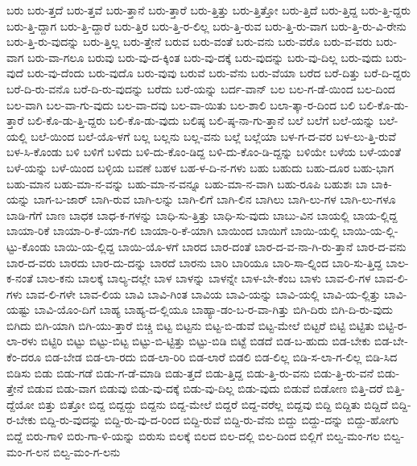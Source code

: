 {ಬರು
ಬರು-ತ್ತದೆ
ಬರು-ತ್ತವೆ
ಬರು-ತ್ತಾನೆ
ಬರು-ತ್ತಾರೆ
ಬರು-ತ್ತಿತ್ತು
ಬರು-ತ್ತಿತ್ತೋ
ಬರು-ತ್ತಿದೆ
ಬರು-ತ್ತಿದ್ದ
ಬರು-ತ್ತಿ-ದ್ದರು
ಬರು-ತ್ತಿ-ದ್ದಾಗ
ಬರು-ತ್ತಿ-ದ್ದಾರೆ
ಬರು-ತ್ತಿರ
ಬರು-ತ್ತಿ-ರ-ಲಿಲ್ಲ
ಬರು-ತ್ತಿ-ರುವ
ಬರು-ತ್ತಿ-ರು-ವಾಗ
ಬರು-ತ್ತಿ-ರು-ವಿ-ರೇನು
ಬರು-ತ್ತಿ-ರು-ವುದನ್ನು
ಬರು-ತ್ತಿಲ್ಲ
ಬರು-ತ್ತೇನೆ
ಬರುವ
ಬರು-ವಂತೆ
ಬರು-ವನು
ಬರು-ವರೊ
ಬರು-ವ-ವರು
ಬರು-ವಾಗ
ಬರು-ವಾ-ಗಲೂ
ಬರುವು
ಬರು-ವು-ದ-ಕ್ಕಿಂತ
ಬರು-ವು-ದಕ್ಕೆ
ಬರು-ವುದನ್ನು
ಬರು-ವು-ದಿಲ್ಲ
ಬರು-ವುದು
ಬರು-ವುದೆ
ಬರು-ವು-ದೆಂದು
ಬರು-ವುದೊ
ಬರು-ವುವು
ಬರುವೆ
ಬರು-ವೆನು
ಬರು-ವೆಯಾ
ಬರೆದ
ಬರೆ-ದಿತ್ತು
ಬರೆ-ದಿ-ದ್ದರು
ಬರೆ-ದಿ-ರು-ವನೊ
ಬರೆ-ದಿ-ರು-ವುದನ್ನು
ಬರೆದು
ಬರೆ-ಯನ್ನು
ಬರ್ದ-ವಾನ್
ಬಲ
ಬಲ-ಗ-ಡೆ-ಯಿಂದ
ಬಲ-ದಿಂದ
ಬಲ-ವಾಗಿ
ಬಲ-ವಾ-ಗು-ವುದು
ಬಲ-ವಾ-ದವು
ಬಲ-ವಾ-ಯಿತು
ಬಲ-ಶಾಲಿ
ಬಲಾ-ತ್ಕಾ-ರ-ದಿಂದ
ಬಲಿ
ಬಲಿ-ಕೊ-ಡು-ತ್ತಾರೆ
ಬಲಿ-ಕೊ-ಡು-ತ್ತಿ-ದ್ದರು
ಬಲಿ-ಕೊ-ಡು-ವುದು
ಬಲಿಷ್ಠ
ಬಲಿ-ಷ್ಠ-ನಾ-ಗು-ತ್ತಾನೆ
ಬಲೆ
ಬಲೆಗೆ
ಬಲೆ-ಯನ್ನು
ಬಲೆ-ಯಲ್ಲಿ
ಬಲೆ-ಯಿಂದ
ಬಲೆ-ಯೊ-ಳಗೆ
ಬಲ್ಲ
ಬಲ್ಲನು
ಬಲ್ಲ-ವನು
ಬಲ್ಲೆ
ಬಲ್ಲೆಯಾ
ಬಳ-ಗ-ದ-ವರ
ಬಳ-ಲು-ತ್ತಿ-ರುವೆ
ಬಳ-ಸಿ-ಕೊಂಡು
ಬಳಿ
ಬಳಿಗೆ
ಬಳಿದು
ಬಳಿ-ದು-ಕೊಂ-ಡಿದ್ದ
ಬಳಿ-ದು-ಕೊಂ-ಡಿ-ದ್ದನ್ನು
ಬಳಿಯೇ
ಬಳೆಯ
ಬಳೆ-ಯಂತೆ
ಬಳೆ-ಯನ್ನು
ಬಳೆ-ಯಿಂದ
ಬಳ್ಳಿಯ
ಬವಣೆ
ಬಹಳ
ಬಹ-ಳ-ದಿ-ನ-ಗಳು
ಬಹು
ಬಹುದು
ಬಹು-ದೂರ
ಬಹು-ಭಾಗ
ಬಹು-ಮಾನ
ಬಹು-ಮಾ-ನ-ವನ್ನು
ಬಹು-ಮಾ-ನ-ವನ್ನೂ
ಬಹು-ಮಾ-ನ-ವಾಗಿ
ಬಹು-ರೂಪಿ
ಬಹುಶಃ
ಬಾ
ಬಾಕಿ-ಯನ್ನು
ಬಾಗ-ಬ-ಜಾರ್
ಬಾಗಿ-ರುವ
ಬಾಗಿ-ಲನ್ನು
ಬಾಗಿ-ಲಿಗೆ
ಬಾಗಿ-ಲಿನ
ಬಾಗಿಲು
ಬಾಗಿ-ಲು-ಗಳ
ಬಾಗಿ-ಲು-ಗಳೂ
ಬಾಡಿ-ಗೆಗೆ
ಬಾಣ
ಬಾಧಕ
ಬಾಧ-ಕ-ಗಳನ್ನು
ಬಾಧಿ-ಸು-ತ್ತಿತ್ತು
ಬಾಧಿ-ಸು-ವುದು
ಬಾಬು-ವಿನ
ಬಾಯಲ್ಲಿ
ಬಾಯ-ಲ್ಲಿದ್ದ
ಬಾಯಾ-ರಿಕೆ
ಬಾಯಾ-ರಿ-ಕೆ-ಯಾ-ಗಲಿ
ಬಾಯಾ-ರಿ-ಕೆ-ಯಾಗಿ
ಬಾಯಿಂದ
ಬಾಯಿಗೆ
ಬಾಯಿ-ಯಲ್ಲಿ
ಬಾಯಿ-ಯ-ಲ್ಲಿ-ಟ್ಟು-ಕೊಂಡು
ಬಾಯಿ-ಯ-ಲ್ಲಿದ್ದ
ಬಾಯಿ-ಯೊ-ಳಗೆ
ಬಾರದ
ಬಾರ-ದಂತೆ
ಬಾರ-ದ-ವ-ನಾ-ಗಿ-ರು-ತ್ತಾನೆ
ಬಾರ-ದ-ವನು
ಬಾರ-ದ-ವರು
ಬಾರದು
ಬಾರ-ದು-ದನ್ನು
ಬಾರದೆ
ಬಾರನು
ಬಾರಿ
ಬಾರಿಯೂ
ಬಾರಿ-ಸಾ-ಲ್ನಿಂದ
ಬಾರಿ-ಸು-ತ್ತಿದ್ದ
ಬಾಲ-ಕ-ನಂತೆ
ಬಾಲ-ಕನು
ಬಾಲಕ್ಕೆ
ಬಾಲ್ಯ-ದಲ್ಲೇ
ಬಾಳ
ಬಾಳನ್ನು
ಬಾಳನ್ನೇ
ಬಾಳ-ಬೇ-ಕೆಂಬ
ಬಾಳು
ಬಾವ-ಲಿ-ಗಳ
ಬಾವ-ಲಿ-ಗಳು
ಬಾವ-ಲಿ-ಗಳೇ
ಬಾವ-ಲಿಯ
ಬಾವಿ
ಬಾವಿ-ಗಿಂತ
ಬಾವಿಯ
ಬಾವಿ-ಯನ್ನು
ಬಾವಿ-ಯಲ್ಲಿ
ಬಾವಿ-ಯ-ಲ್ಲಿತ್ತು
ಬಾವಿ-ಯಷ್ಟು
ಬಾವಿ-ಯೊಂ-ದಿಗೆ
ಬಾಹ್ಯ
ಬಾಹ್ಯ-ದ-ಲ್ಲಿಯೂ
ಬಾಹ್ಯಾ-ಡಂ-ಬ-ರ-ವಾ-ಗಿತ್ತು
ಬಿಗಿ-ದಿರು
ಬಿಗಿ-ದಿ-ರು-ವುದು
ಬಿಗಿದು
ಬಿಗಿ-ಯಾಗಿ
ಬಿಗಿ-ಯು-ತ್ತಾರೆ
ಬಿಚ್ಚಿ
ಬಿಟ್ಟ
ಬಿಟ್ಟನು
ಬಿಟ್ಟ-ಬಿ-ಡುವೆ
ಬಿಟ್ಟ-ಮೇಲೆ
ಬಿಟ್ಟರೆ
ಬಿಟ್ಟಿ
ಬಿಟ್ಟಿತು
ಬಿಟ್ಟಿ-ರ-ಲಾ-ರಳು
ಬಿಟ್ಟಿರಿ
ಬಿಟ್ಟು
ಬಿಟ್ಟು-ಬಿಟ್ಟ
ಬಿಟ್ಟು-ಬಿ-ಟ್ಟಿತ್ತು
ಬಿಟ್ಟು-ಬಿಡಿ
ಬಿಟ್ಟೆ
ಬಿಡದೆ
ಬಿಡ-ಬ-ಹುದು
ಬಿಡ-ಬೇಕು
ಬಿಡ-ಬೇ-ಕೆಂ-ದರೂ
ಬಿಡ-ಬೇಡ
ಬಿಡ-ಲಾ-ರದು
ಬಿಡ-ಲಾ-ರಿರಿ
ಬಿಡ-ಲಾರೆ
ಬಿಡಲಿ
ಬಿಡ-ಲಿಲ್ಲ
ಬಿಡಿ-ಸ-ಲಾ-ಗ-ಲಿಲ್ಲ
ಬಿಡಿ-ಸಿದ
ಬಿಡಿಸು
ಬಿಡು
ಬಿಡು-ಗಡೆ
ಬಿಡು-ಗ-ಡೆ-ಮಾಡಿ
ಬಿಡು-ತ್ತದೆ
ಬಿಡು-ತ್ತಿದ್ದ
ಬಿಡು-ತ್ತಿ-ರು-ವನು
ಬಿಡು-ತ್ತಿ-ರು-ವನೆ
ಬಿಡು-ತ್ತೇನೆ
ಬಿಡುವ
ಬಿಡು-ವಾಗ
ಬಿಡುವು
ಬಿಡು-ವು-ದಕ್ಕೆ
ಬಿಡು-ವು-ದಿಲ್ಲ
ಬಿಡು-ವುದು
ಬಿಡುವೆ
ಬಿಡೋಣ
ಬಿತ್ತಿ-ದರೆ
ಬಿತ್ತಿ-ದ್ದೆಯೋ
ಬಿತ್ತು
ಬಿತ್ತೋ
ಬಿದ್ದ
ಬಿದ್ದದ್ದು
ಬಿದ್ದನು
ಬಿದ್ದ-ಮೇಲೆ
ಬಿದ್ದರೆ
ಬಿದ್ದ-ವರೆಲ್ಲ
ಬಿದ್ದವು
ಬಿದ್ದಿ
ಬಿದ್ದಿತು
ಬಿದ್ದಿದೆ
ಬಿದ್ದಿ-ರ-ಬೇಕು
ಬಿದ್ದಿ-ರು-ವುದನ್ನು
ಬಿದ್ದಿ-ರು-ವು-ದ-ರಿಂದ
ಬಿದ್ದಿ-ರುವೆ
ಬಿದ್ದಿ-ರು-ವೆನು
ಬಿದ್ದು
ಬಿದ್ದು-ದನ್ನು
ಬಿದ್ದು-ಹೋಗು
ಬಿದ್ದೆ
ಬಿರು-ಗಾಳಿ
ಬಿರು-ಗಾ-ಳಿ-ಯನ್ನು
ಬಿರುಸು
ಬಿಲಕ್ಕೆ
ಬಿಲದ
ಬಿಲ-ದಲ್ಲಿ
ಬಿಲ-ದಿಂದ
ಬಿಲ್ಲಿಗೆ
ಬಿಲ್ವ-ಮಂ-ಗಲ
ಬಿಲ್ವ-ಮಂ-ಗ-ಲನ
ಬಿಲ್ವ-ಮಂ-ಗ-ಲನು
}
